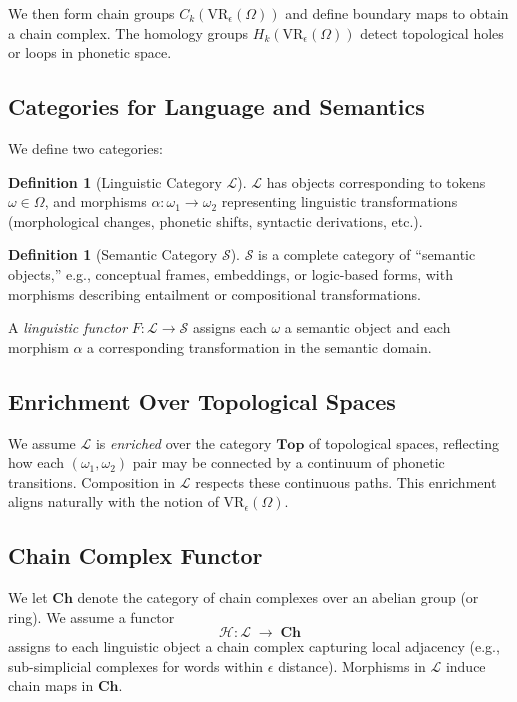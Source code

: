 \documentclass[11pt]{article}
\theoremstyle{definition}
\newtheorem{definition}[theorem]{Definition}
\theoremstyle{remark}
\begin{document}
We then form chain groups \(C_k(\mathrm{VR}_\epsilon(\Omega))\) and define boundary maps to obtain a chain complex. The homology groups \(H_k(\mathrm{VR}_\epsilon(\Omega))\) detect topological holes or loops in phonetic space.

\subsection{Categories for Language and Semantics}

We define two categories:

\begin{definition}[Linguistic Category \(\mathcal{L}\)]
\(\mathcal{L}\) has objects corresponding to tokens \(\omega \in \Omega\), and morphisms \(\alpha:\omega_1 \to \omega_2\) representing linguistic transformations (morphological changes, phonetic shifts, syntactic derivations, etc.).
\end{definition}

\begin{definition}[Semantic Category \(\mathcal{S}\)]
\(\mathcal{S}\) is a complete category of ``semantic objects,'' e.g., conceptual frames, embeddings, or logic-based forms, with morphisms describing entailment or compositional transformations.
\end{definition}

A \emph{linguistic functor} \(F: \mathcal{L}\to\mathcal{S}\) assigns each \(\omega\) a semantic object and each morphism \(\alpha\) a corresponding transformation in the semantic domain.

\subsection{Enrichment Over Topological Spaces}

We assume \(\mathcal{L}\) is \emph{enriched} over the category \(\mathbf{Top}\) of topological spaces, reflecting how each \((\omega_1,\omega_2)\) pair may be connected by a continuum of phonetic transitions. Composition in \(\mathcal{L}\) respects these continuous paths. This enrichment aligns naturally with the notion of \(\mathrm{VR}_\epsilon(\Omega)\).

\subsection{Chain Complex Functor}

We let \(\mathbf{Ch}\) denote the category of chain complexes over an abelian group (or ring). We assume a functor
\[
\mathcal{H} : \mathcal{L}\;\longrightarrow\;\mathbf{Ch}
\]
assigns to each linguistic object a chain complex capturing local adjacency (e.g., sub-simplicial complexes for words within \(\epsilon\) distance). Morphisms in \(\mathcal{L}\) induce chain maps in \(\mathbf{Ch}\).
\end{document}
